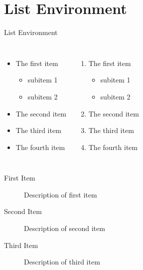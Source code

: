\documentclass[compress,10pt,dvipsnames,notheorems]{beamer} %
\begin{document}
\section{List Environment}%
\begin{frame}{List Environment} %
	\begin{columns}
		\begin{itemize}
			\item The first item
			\begin{itemize}
				\item subitem 1
				\item subitem 2
			\end{itemize}
			\item The second item
			\item The third item
			\item The fourth item
		\end{itemize}

		\begin{enumerate}
			\item The first item
			\begin{itemize}
				\item subitem 1
				\item subitem 2
			\end{itemize}
			\item The second item
			\item The third item
			\item The fourth item
		\end{enumerate}
	\end{columns}\vspace{2em}

	\begin{description}
		\item[First Item] Description of first item
		\item[Second Item] Description of second item
		\item[Third Item] Description of third item
	\end{description}
\end{frame}
\end{document}
